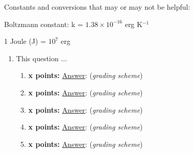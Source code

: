 \documentclass[12pt]{article}
\begin{document}
Constants and conversions that may or may not be helpful:
\begin{itemize*}
    \item Boltzmann constant: k = $1.38\times10^{-16}$ erg K$^{-1}$
    \item 1 Joule (J) = $10^7$ erg
\end{itemize*}

\newpage

\begin{enumerate}
    \item This question $\ldots$
        \begin{enumerate}
            \item \textbf{x points:}
                {\small\underline{Answer}:
                (\emph{grading scheme})}
            \item \textbf{x points:}
                {\small\underline{Answer}:
                (\emph{grading scheme})}
            \item \textbf{x points:}
                {\small\underline{Answer}:
                (\emph{grading scheme})}
            \item \textbf{x points:}
                {\small\underline{Answer}:
                (\emph{grading scheme})}
            \item \textbf{x points:}
                {\small\underline{Answer}:
                (\emph{grading scheme})}
        \end{enumerate}
\end{enumerate}
\end{document}
